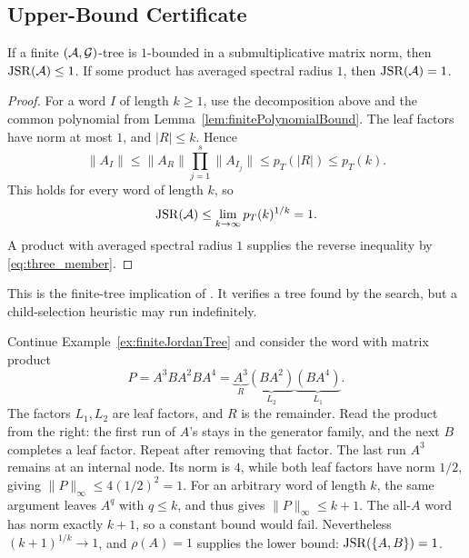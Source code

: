 \subsection{Upper-Bound Certificate}

\begin{theorem}
    \label{thm:finiteTreeTermination}
    If a finite $(\mathcal{A},\mathcal{G})$-tree is $1$-bounded in a submultiplicative matrix norm, then $\operatorname{JSR}(\mathcal{A})\leq1$.
    If some product has averaged spectral radius $1$, then $\operatorname{JSR}(\mathcal{A})=1$.
\end{theorem}

\begin{proof}
    For a word $I$ of length $k\geq1$, use the decomposition above and the common polynomial from Lemma~\ref{lem:finitePolynomialBound}.
    The leaf factors have norm at most $1$, and $|R|\leq k$.
    Hence
    \[
        \lVert A_I\rVert
        \leq\lVert A_R\rVert\prod_{j=1}^s\lVert A_{I_j}\rVert
        \leq p_T(|R|)\leq p_T(k).
    \]
    This holds for every word of length $k$, so
    \[
        \operatorname{JSR}(\mathcal{A})
        \leq\lim_{k\to\infty}p_T(k)^{1/k}=1.
    \]
    A product with averaged spectral radius $1$ supplies the reverse inequality by \eqref{eq:three_member}.
\end{proof}

This is the finite-tree implication of \citet{MoellerReif2014TreeBasedJSR}.
It verifies a tree found by the search, but a child-selection heuristic may run indefinitely.

\begin{example}
    \label{ex:finiteLeafDecomposition}
    Continue Example~\ref{ex:finiteJordanTree} and consider the word with matrix product
    \[
        P=A^3BA^2BA^4
        =\underbrace{A^3}_{R}
        \underbrace{(BA^2)}_{L_2}
        \underbrace{(BA^4)}_{L_1}.
    \]
    The factors $L_1,L_2$ are leaf factors, and $R$ is the remainder.
    Read the product from the right: the first run of $A$'s stays in the generator family, and the next $B$ completes a leaf factor.
    Repeat after removing that factor.
    The last run $A^3$ remains at an internal node.
    Its norm is $4$, while both leaf factors have norm $1/2$, giving $\lVert P\rVert_\infty\leq4(1/2)^2=1$.
    For an arbitrary word of length $k$, the same argument leaves $A^q$ with $q\leq k$, and thus gives $\lVert P\rVert_\infty\leq k+1$.
    The all-$A$ word has norm exactly $k+1$, so a constant bound would fail.
    Nevertheless $(k+1)^{1/k}\to1$, and $\rho(A)=1$ supplies the lower bound: $\operatorname{JSR}(\{A,B\})=1$.
\end{example}

